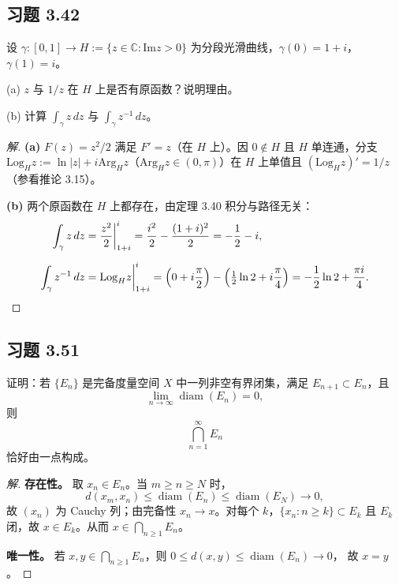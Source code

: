 \documentclass[11pt,a4paper]{article}
\newcommand{\C}{\mathbb{C}}
\renewcommand{\Im}{\mathrm{Im}}
\newcommand{\Arg}{\mathrm{Arg}}
\newcommand{\Log}{\mathrm{Log}}
\theoremstyle{definition}
\newenvironment{solution}{\begin{proof}[解]}{\end{proof}}
\begin{document}
\subsection{习题 3.42}

设 $\gamma : [0,1] \to H := \{z \in \C : \Im z > 0\}$ 为分段光滑曲线，$\gamma(0)=1+i$，$\gamma(1)=i$。

(a) $z$ 与 $1/z$ 在 $H$ 上是否有原函数？说明理由。

(b) 计算 $\int_\gamma z\,dz$ 与 $\int_\gamma z^{-1}\,dz$。

\begin{solution}
	\textbf{(a)}\;
	$F(z)=z^2/2$ 满足 $F'=z$（在 $H$ 上）。因 $0\notin H$ 且 $H$ 单连通，分支 $\Log_H z:=\ln|z|+i\Arg_H z$（$\Arg_H z\in(0,\pi)$）在 $H$ 上单值且 $(\Log_H z)'=1/z$（参看推论 3.15）。

	\medskip

	\textbf{(b)}\;
	两个原函数在 $H$ 上都存在，由定理 3.40 积分与路径无关：
	\begin{align*}
		\int_\gamma z\,dz
		&=\frac{z^2}{2}\bigg|_{1+i}^{i}
		=\frac{i^2}{2}-\frac{(1+i)^2}{2}
		=-\frac12-i,\\[6pt]
		\int_\gamma z^{-1}\,dz
		&=\Log_H z\bigg|_{1+i}^{i}
		=\Bigl(0+i\frac\pi2\Bigr)
		-\Bigl(\tfrac12\ln2+i\frac\pi4\Bigr)
		=-\frac12\ln2+\frac{\pi i}{4}.\qedhere
	\end{align*}
\end{solution}

\subsection{习题 3.51}

证明：若 $\{E_n\}$ 是完备度量空间 $X$ 中一列非空有界闭集，满足 $E_{n+1} \subset E_n$，且
\[
	\lim_{n\to\infty} \operatorname{diam}(E_n)=0,
\]
则
\[
	\bigcap_{n=1}^{\infty} E_n
\]
恰好由一点构成。

\begin{solution}
	\textbf{存在性。}\;
	取 $x_n\in E_n$。当 $m\ge n\ge N$ 时，
	\[
		d(x_m,x_n)\le\operatorname{diam}(E_n)
		\le\operatorname{diam}(E_N)\to0,
	\]
	故 $(x_n)$ 为 Cauchy 列；由完备性 $x_n\to x$。对每个 $k$，$\{x_n:n\ge k\}\subset E_k$ 且 $E_k$ 闭，故 $x\in E_k$。从而 $x\in\bigcap_{n\ge1}E_n$。

	\medskip

	\textbf{唯一性。}\;
	若 $x,y\in\bigcap_{n\ge1}E_n$，则
	$0\le d(x,y)\le\operatorname{diam}(E_n)\to0$，
	故 $x=y$。\qedhere
\end{solution}
\end{document}
